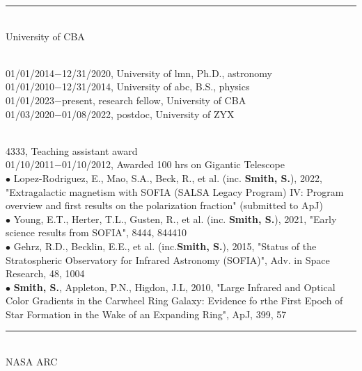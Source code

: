 \medskip \hrule \vspace{5pt} \medskip
{}\\
University of CBA
\par \vspace{-0.5em}
\\
01/01/2014$-$12/31/2020, University of lmn, Ph.D., astronomy\\
01/01/2010$-$12/31/2014, University of abc, B.S., physics
\mySectionSpacing
{}\\
01/01/2023$-$present, research fellow, University of CBA\\
01/03/2020$-$01/08/2022, postdoc, University of ZYX
\par \vspace{-0.5em}
\\
4333, Teaching assistant award\\
01/10/2011$-$01/10/2012, Awarded 100 hrs on Gigantic Telescope
\mySectionSpacing
{}\\
{\scriptsize{$\bullet$}} Lopez-Rodriguez, E., Mao, S.A., Beck, R., et al. (inc. \textbf{Smith, S.}), 2022, "Extragalactic magnetism with SOFIA (SALSA Legacy Program) IV: Program overview and first results on the polarization fraction" (submitted to ApJ)\\
{\scriptsize{$\bullet$}} Young, E.T., Herter, T.L., Gusten, R., et al. (inc. \textbf{Smith, S.}), 2021, "Early science results from SOFIA", 8444, 844410\\
{\scriptsize{$\bullet$}} Gehrz, R.D., Becklin, E.E., et al. (inc.\textbf{Smith, S.}), 2015, "Status of the Stratospheric Observatory for Infrared Astronomy (SOFIA)", Adv. in Space Research, 48, 1004\\
{\scriptsize{$\bullet$}} \textbf{Smith, S.}, Appleton, P.N., Higdon, J.L, 2010, "Large Infrared and Optical Color Gradients in the Carwheel Ring Galaxy: Evidence fo rthe First Epoch of Star Formation in the Wake of an Expanding Ring", ApJ, 399, 57
\medskip \hrule \vspace{5pt} \medskip
{}\\
NASA ARC
\par \vspace{-0.5em}
\\
